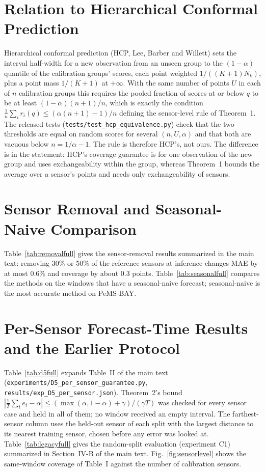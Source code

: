 \documentclass[journal,onecolumn]{IEEEtran}
\begin{document}
\section{Relation to Hierarchical Conformal Prediction}
Hierarchical conformal prediction (HCP, Lee, Barber and Willett) sets the interval half-width for a new
observation from an unseen group to the $(1-\alpha)$ quantile of the calibration groups' scores, each point
weighted $1/((K+1)N_k)$, plus a point mass $1/(K+1)$ at $+\infty$. With the same number of points $U$ in
each of $n$ calibration groups this requires the pooled fraction of scores at or below $q$ to be at least
$(1-\alpha)(n+1)/n$, which is exactly the condition $\frac1n\sum_i r_i(q)\le(\alpha(n+1)-1)/n$ defining the
sensor-level rule of Theorem~1. The released tests (\texttt{tests/test\_hcp\_equivalence.py}) check that the two
thresholds are equal on random scores for several $(n,U,\alpha)$ and that both are vacuous below
$n=1/\alpha-1$. The rule is therefore HCP's, not ours. The difference is in the statement: HCP's coverage
guarantee is for one observation of the new group and uses exchangeability within the group, whereas
Theorem~1 bounds the average over a sensor's points and needs only exchangeability of sensors.

\section{Sensor Removal and Seasonal-Naive Comparison}
Table~\ref{tab:removalfull} gives the sensor-removal results summarized in the main text: removing 30\% or 50\% of
the reference sensors at inference changes MAE by at most 0.6\% and coverage by about 0.3 points. Table~\ref{tab:seasonalfull}
compares the methods on the windows that have a seasonal-naive forecast; seasonal-naive is the most accurate
method on PeMS-BAY.

\section{Per-Sensor Forecast-Time Results and the Earlier Protocol}
Table~\ref{tab:d5full} expands Table~II of the main text (\texttt{experiments/D5\_per\_sensor\_guarantee.py},
\texttt{results/exp\_D5\_per\_sensor.json}). Theorem~2's bound
$|\frac1T\sum_t e_t-\alpha|\le(\max(\alpha,1-\alpha)+\gamma)/(\gamma T)$ was checked for every sensor case and held in
all of them; no window received an empty interval. The farthest-sensor column uses the held-out sensor of each split
with the largest distance to its nearest training sensor, chosen before any error was looked at.
Table~\ref{tab:legacyfull} gives the random-split evaluation (experiment C1) summarized in Section~IV-B of the main
text. Fig.~\ref{fig:sensorlevel} shows the same-window coverage of Table~I against the number of calibration sensors.
\end{document}

